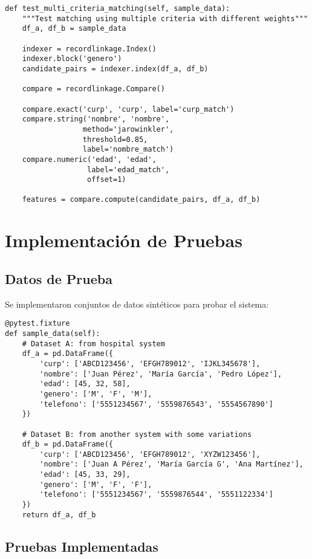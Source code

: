 \documentclass[12pt]{article}
\begin{document}
\begin{lstlisting}[caption=Implementación de Record Linkage]
def test_multi_criteria_matching(self, sample_data):
    """Test matching using multiple criteria with different weights"""
    df_a, df_b = sample_data
    
    indexer = recordlinkage.Index()
    indexer.block('genero')
    candidate_pairs = indexer.index(df_a, df_b)
    
    compare = recordlinkage.Compare()
    
    compare.exact('curp', 'curp', label='curp_match')
    compare.string('nombre', 'nombre', 
                  method='jarowinkler', 
                  threshold=0.85,
                  label='nombre_match')
    compare.numeric('edad', 'edad', 
                   label='edad_match',
                   offset=1)
    
    features = compare.compute(candidate_pairs, df_a, df_b)
\end{lstlisting}

\section{Implementación de Pruebas}

\subsection{Datos de Prueba}
Se implementaron conjuntos de datos sintéticos para probar el sistema:

\begin{lstlisting}[caption=Datos de prueba para record linkage]
@pytest.fixture
def sample_data(self):
    # Dataset A: from hospital system
    df_a = pd.DataFrame({
        'curp': ['ABCD123456', 'EFGH789012', 'IJKL345678'],
        'nombre': ['Juan Pérez', 'María García', 'Pedro López'],
        'edad': [45, 32, 58],
        'genero': ['M', 'F', 'M'],
        'telefono': ['5551234567', '5559876543', '5554567890']
    })
    
    # Dataset B: from another system with some variations
    df_b = pd.DataFrame({
        'curp': ['ABCD123456', 'EFGH789012', 'XYZW123456'],
        'nombre': ['Juan A Pérez', 'María García G', 'Ana Martínez'],
        'edad': [45, 33, 29],
        'genero': ['M', 'F', 'F'],
        'telefono': ['5551234567', '5559876544', '5551122334']
    })
    return df_a, df_b
\end{lstlisting}

\subsection{Pruebas Implementadas}
\end{document}

